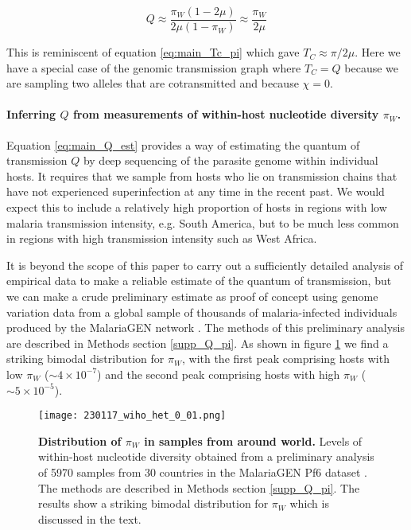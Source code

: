 \documentclass[_main.tex]{subfiles}
\begin{document}
\begin{equation}
Q 
\approx \frac{ \pi_W ( 1 - 2 \mu) }{ 2 \mu ( 1 - \pi_W ) }
\approx \frac{ \pi_W }{ 2 \mu }
\label{eq:main_Q_est}
\end{equation}

This is reminiscent of equation \ref{eq:main_Tc_pi} which gave $T_C \approx \pi / 2\mu$.  Here we have a special case of the genomic transmission graph where $T_C = Q$ because we are sampling two alleles that are cotransmitted and because $\chi=0$. 

\paragraph{Inferring $Q$ from measurements of within-host nucleotide diversity $\pi_W$.}  Equation \ref{eq:main_Q_est} provides a way of estimating the quantum of transmission $Q$ by deep sequencing of the parasite genome within individual hosts.  It requires that we sample from hosts who lie on transmission chains that have not experienced superinfection at any time in the recent past.  We would expect this to include a relatively high proportion of hosts in regions with low malaria transmission intensity, e.g. South America, but to be much less common in regions with high transmission intensity such as West Africa.

It is beyond the scope of this paper to carry out a sufficiently detailed analysis of empirical data to make a reliable estimate of the quantum of transmission, but we can make a crude preliminary estimate as proof of concept using genome variation data from a global sample of thousands of malaria-infected individuals produced by the MalariaGEN network \cite{MalariaGEN2021}.  The methods of this preliminary analysis are described in Methods section \ref{supp_Q_pi}.  As shown in figure \ref{fig:main_pi_w_distribution} we find a striking bimodal distribution for $\pi_W$, with the first peak comprising hosts with low $\pi_W$ ($\sim 4 \times 10^{-7}$) and the second peak comprising hosts with high $\pi_W$ ($\sim 5 \times 10^{-5}$).

\begin{figure}[h!]
\centering
\texttt{[image: 230117\_wiho\_het\_0\_01.png]}
\caption{
\textbf{Distribution of $\pi_W$ in samples from around world.}  Levels of within-host nucleotide diversity obtained from a preliminary analysis of 5970 samples from 30 countries in the MalariaGEN Pf6 dataset \cite{MalariaGEN2021}.  The methods are described in Methods section \ref{supp_Q_pi}.  The results show a striking bimodal distribution for $\pi_W$ which is discussed in the text.
}
\label{fig:main_pi_w_distribution}
\end{figure}
\end{document}
